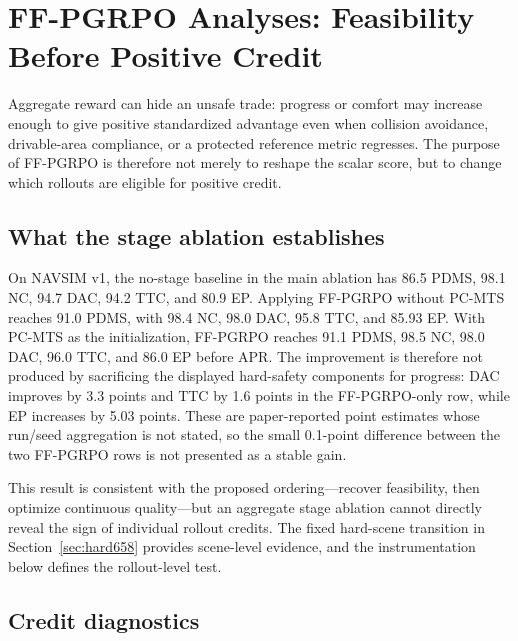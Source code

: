 \section{FF-PGRPO Analyses: Feasibility Before Positive Credit}
\label{sec:ffpgrpo-analysis}

Aggregate reward can hide an unsafe trade: progress or comfort may increase
enough to give positive standardized advantage even when collision avoidance,
drivable-area compliance, or a protected reference metric regresses.  The
purpose of FF-PGRPO is therefore not merely to reshape the scalar score, but to
change which rollouts are eligible for positive credit.

\subsection{What the stage ablation establishes}
\label{sec:ffpgrpo-stage-ablation}

On NAVSIM v1, the no-stage baseline in the main ablation has 86.5 PDMS, 98.1
NC, 94.7 DAC, 94.2 TTC, and 80.9 EP.  Applying FF-PGRPO without PC-MTS reaches
91.0 PDMS, with 98.4 NC, 98.0 DAC, 95.8 TTC, and 85.93 EP.  With PC-MTS as the
initialization, FF-PGRPO reaches 91.1 PDMS, 98.5 NC, 98.0 DAC, 96.0 TTC, and
86.0 EP before APR.  The improvement is therefore not produced by sacrificing
the displayed hard-safety components for progress: DAC improves by 3.3 points
and TTC by 1.6 points in the FF-PGRPO-only row, while EP increases by 5.03
points.  These are paper-reported point estimates whose run/seed aggregation
is not stated, so the small 0.1-point
difference between the two FF-PGRPO rows is not presented as a stable gain.



This result is consistent with the proposed ordering---recover feasibility,
then optimize continuous quality---but an aggregate stage ablation cannot
directly reveal the sign of individual rollout credits.  The fixed hard-scene
transition in Section~\ref{sec:hard658} provides scene-level evidence, and the
instrumentation below defines the rollout-level test.

\subsection{Credit diagnostics}
\label{sec:ffpgrpo-credit-diagnostics}

